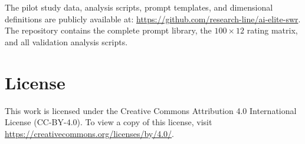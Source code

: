 \documentclass[11pt,a4paper]{article}
\begin{document}
\noindent The pilot study data, analysis scripts, prompt templates, and dimensional definitions are publicly available at: \url{https://github.com/research-line/ai-elite-swr}. The repository contains the complete prompt library, the $100 \times 12$ rating matrix, and all validation analysis scripts.


\section*{License}

\noindent This work is licensed under the Creative Commons Attribution 4.0 International License (CC-BY-4.0). To view a copy of this license, visit \url{https://creativecommons.org/licenses/by/4.0/}.


\newpage
\end{document}
